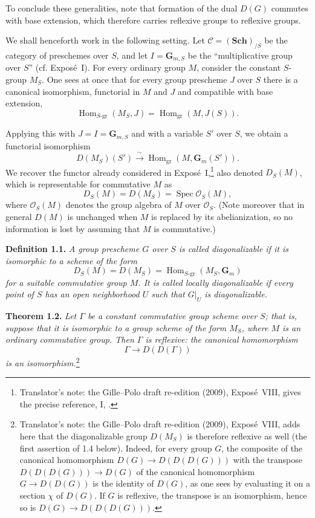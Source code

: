 To conclude these generalities, note that formation of the dual \(D(G)\)
commutes with base extension, which therefore carries reflexive groups to
reflexive groups.

We shall henceforth work in the following setting. Let
\(\mathscr C=(\mathbf{Sch})_{/S}\) be the category of preschemes over \(S\),
and let \(I=\mathbf G_{m,S}\) be the ``multiplicative group over \(S\)''
(cf. Expos\'e~I). For every ordinary group \(M\), consider the constant
\(S\)-group \(M_S\). One sees at once that for every group prescheme \(J\)
over \(S\) there is a canonical isomorphism, functorial in \(M\) and \(J\)
and compatible with base extension,
\[
  \operatorname{Hom}_{S\text{-}\mathrm{gr}}(M_S,J)
  =\operatorname{Hom}_{\mathrm{gr}}(M,J(S)).
\]

Applying this with \(J=I=\mathbf G_{m,S}\) and with a variable \(S'\) over
\(S\), we obtain a functorial isomorphism
\[
  D(M_S)(S')
  \xrightarrow{\ \sim\ }
  \operatorname{Hom}_{\mathrm{gr}}(M,\mathbf G_m(S')).
\]
We recover the functor already considered in Expos\'e~I,\footnote{Translator's
note: the Gille--Polo draft re-edition (2009), Expos\'e~VIII, gives the precise
reference, I, .} also denoted
\(D_S(M)\), which is representable for commutative \(M\) as
\[
  D_S(M)=D(M_S)=\operatorname{Spec}\mathscr O_S(M),
\]
where \(\mathscr O_S(M)\) denotes the group algebra of \(M\) over
\(\mathscr O_S\). (Note moreover that in general \(D(M)\) is unchanged when
\(M\) is replaced by its abelianization, so no information is lost by
assuming that \(M\) is commutative.)

\medskip
\noindent{}\textbf{Definition 1.1.}
\textit{A group prescheme \(G\) over \(S\) is called \emph{diagonalizable}
if it is isomorphic to a scheme of the form}
\[
  D_S(M)=D(M_S)
  =\operatorname{Hom}_{S\text{-}\mathrm{gr}}(M_S,\mathbf G_m)
\]
\textit{for a suitable commutative group \(M\). It is called
\emph{locally diagonalizable} if every point of \(S\) has an open
neighborhood \(U\) such that \(G|_U\) is diagonalizable.}

\medskip
\noindent{}\textbf{Theorem 1.2.}
\textit{Let \(\Gamma\) be a constant commutative group scheme over \(S\);
that is, suppose that it is isomorphic to a group scheme of the form \(M_S\),
where \(M\) is an ordinary commutative group. Then \(\Gamma\) is reflexive:
the canonical homomorphism}
\[
  \Gamma\longrightarrow D(D(\Gamma))
\]
\textit{is an isomorphism.}\footnote{Translator's note: the Gille--Polo draft re-edition
(2009), Expos\'e~VIII, adds here that the diagonalizable group \(D(M_S)\) is therefore
reflexive as well (the first assertion of 1.4 below). Indeed, for every group \(G\), the
composite of the canonical homomorphism \(D(G)\to D(D(D(G)))\) with the transpose
\(D(D(D(G)))\to D(G)\) of the canonical homomorphism \(G\to D(D(G))\) is the identity of
\(D(G)\), as one sees by evaluating it on a section \(\chi\) of \(D(G)\). If \(G\) is
reflexive, the transpose is an isomorphism, hence so is \(D(G)\to D(D(D(G)))\).}

